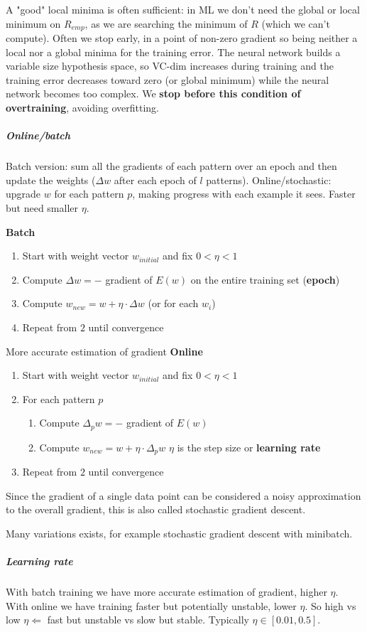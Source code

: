 \documentclass[10pt]{report}
\begin{document}
A "good" local minima is often sufficient: in ML we don't need the global or local minimum on $R_{emp}$, as we are searching the minimum of $R$ (which we can't compute). Often we stop early, in a point of non-zero gradient so being neither a local nor a global minima for the training error. The neural network builds a variable size hypothesis space, so VC-dim increases during training and the training error decreases toward zero (or global minimum) while the neural network becomes too complex. We \textbf{stop before this condition of overtraining}, avoiding overfitting.
\subparagraph{Online/batch} Batch version: sum all the gradients of each pattern over an epoch and then update the weights ($\Delta w$ after each epoch of $l$ patterns). Online/stochastic: upgrade $w$ for each pattern $p$, making progress with each example it sees. Faster but need smaller $\eta$.\begin{multicols}{2}
\textbf{Batch}
\begin{enumerate}
	\item Start with weight vector $w_{initial}$ and fix $0 < \eta < 1$
	\item Compute $\Delta w = -$ gradient of $E(w)$ on the entire training set (\textbf{epoch})
	\item Compute $w_{new} = w + \eta\cdot\Delta w$ (or for each $w_i$)
	\item Repeat from $2$ until convergence
\end{enumerate}
More accurate estimation of gradient
\columnbreak
\textbf{Online}
\begin{enumerate}
	\item Start with weight vector $w_{initial}$ and fix $0 < \eta < 1$
	\item For each pattern $p$\begin{enumerate}
		\item Compute $\Delta_p w = -$ gradient of $E(w)$
		\item Compute $w_{new} = w + \eta\cdot\Delta_p w$
	$\eta$ is the step size or \textbf{learning rate}
	\end{enumerate}
	\item Repeat from $2$ until convergence
\end{enumerate}
Since the gradient of a single data point can be considered a noisy approximation to the overall gradient, this is also called stochastic gradient descent.
\end{multicols}
Many variations exists, for example stochastic gradient descent with minibatch.
\subparagraph{Learning rate} With batch training we have more accurate estimation of gradient, higher $\eta$. With online we have training faster but potentially unstable, lower $\eta$. So high vs low $\eta \Leftarrow$ fast but unstable vs slow but stable. Typically $\eta \in [0.01, 0.5]$.\\
\end{document}
